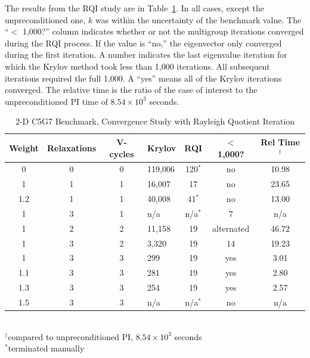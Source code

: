 \documentclass[preprint,12pt]{elsarticle}
\begin{document}
The results from the RQI study are in Table~\ref{table:2-D c5g7 rqi}. In all cases, except the unpreconditioned one, $k$ was within the uncertainty of the benchmark value. The ``$<$ 1,000?'' column indicates whether or not the multigroup iterations converged during the RQI process. If the value is ``no,'' the eigenvector only converged during the first iteration. A number indicates the last eigenvalue iteration for which the Krylov method took less than 1,000 iterations. All subsequent iterations required the full 1,000. A ``yes'' means all of the Krylov iterations converged. The relative time is the ratio of the case of interest to the unpreconditioned PI time of $8.54 \times 10^{3}$ seconds.
%
\begin{table}[!h]
\caption{2-D C5G7 Benchmark, Convergence Study with Rayleigh Quotient Iteration}
\begin{center}
\begin{tabular}{| c | c | c | l | c | c | c |}
\hline
Weight & Relaxations & V-cycles & Krylov & RQI & $<$ 1,000? & Rel Time$^{\dag}$\\[0.5ex]
\hline
0    & 0 & 0 & 119,006 & 120$^{*}$ & no & 10.98 \\%
1    & 1 & 1 & 16,007   & 17            & no & 23.65 \\ %
1.2 & 1 & 1 & 40,008   & 41$^{*}$   & no & 13.00 \\ %
1    & 3 & 1 & n/a         & n/a$^{*}$  & 7   & n/a \\
1    & 2 & 2 & 11,158   & 19            & alternated & 46.72 \\ %
1    & 3 & 2 & 3,320     & 19            & 14 &19.23 \\ %
\hline
1    & 3 & 3 & 299        & 19            & yes & 3.01 \\ %
1.1 & 3 & 3 & 281        & 19            & yes & 2.80 \\ %
1.3 & 3 & 3 & 254        & 19            & yes & 2.57 \\ %
1.5 & 3 & 3 & n/a         & n/a$^{*}$ & no & n/a \\
\hline 
\end{tabular} \\
$^{\dag}$compared to unpreconditioned PI, $8.54 \times 10^{3}$ seconds\\
$^{*}$terminated manually
\end{center}
\label{table:2-D c5g7 rqi}
\end{table}
\end{document}
